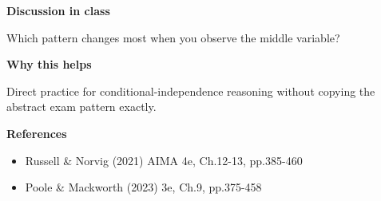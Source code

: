 \documentclass[11pt]{article}
\begin{document}
\begin{tcolorbox}[colback=white,colframe=MidnightBlue,title={Q2 Structured Problem},fonttitle=\bfseries,breakable]
{\large\bfseries\color{MidnightBlue} Discussion in class}\par\medskip
Which pattern changes most when you observe the middle variable?

{\large\bfseries\color{MidnightBlue} Why this helps}\par\medskip
Direct practice for conditional-independence reasoning without copying the abstract exam pattern exactly.

{\large\bfseries\color{MidnightBlue} References}\par\medskip
\begin{itemize}\item Russell \& Norvig (2021) AIMA 4e, Ch.12-13, pp.385-460
\item Poole \& Mackworth (2023) 3e, Ch.9, pp.375-458\end{itemize}
\end{tcolorbox}
\end{document}
